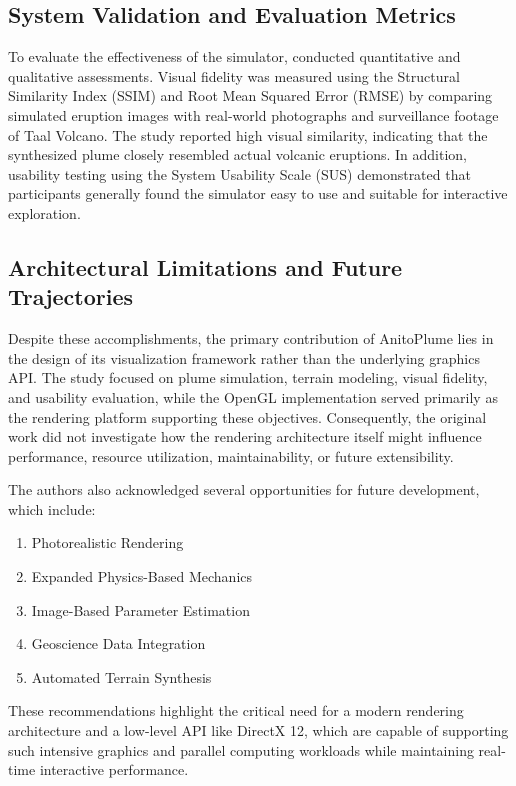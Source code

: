 \subsection{System Validation and Evaluation Metrics}
To evaluate the effectiveness of the simulator, \citeauthor{del2026interactive} conducted quantitative and qualitative assessments.
Visual fidelity was measured using the Structural Similarity Index (SSIM) and Root Mean Squared Error (RMSE) by comparing simulated eruption images with real-world photographs and surveillance footage of Taal Volcano.
The study reported high visual similarity, indicating that the synthesized plume closely resembled actual volcanic eruptions.
In addition, usability testing using the System Usability Scale (SUS) demonstrated that participants generally found the simulator easy to use and suitable for interactive exploration.

\subsection{Architectural Limitations and Future Trajectories}
Despite these accomplishments, the primary contribution of AnitoPlume lies in the design of its visualization framework rather than the underlying graphics API.
The study focused on plume simulation, terrain modeling, visual fidelity, and usability evaluation, while the OpenGL implementation served primarily as the rendering platform supporting these objectives.
Consequently, the original work did not investigate how the rendering architecture itself might influence performance, resource utilization, maintainability, or future extensibility.

The authors also acknowledged several opportunities for future development, which include:
\begin{enumerate}
   \item Photorealistic Rendering
   \item Expanded Physics-Based Mechanics
   \item Image-Based Parameter Estimation
   \item Geoscience Data Integration
   \item Automated Terrain Synthesis
\end{enumerate}
These recommendations highlight the critical need for a modern rendering architecture and a low-level API like DirectX 12, which are capable of supporting such intensive graphics and parallel computing workloads while maintaining real-time interactive performance.

